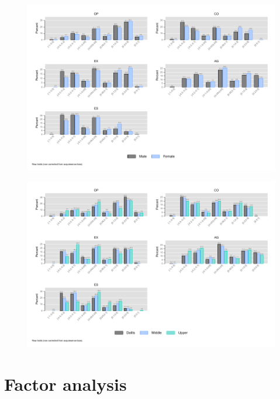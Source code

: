 \documentclass[a4paper, 12pt, onecolumn]{article}
\begin{document}
\begin{figure}[!h]
\raggedright
\includegraphics[scale=0.8]{INPUT/diff_gender_raw}
\caption{}
\label{fig:diffgendercor}
\end{figure}

\begin{figure}[!h]
\raggedright
\includegraphics[scale=0.8]{INPUT/diff_caste_raw}
\caption{}
\label{fig:diffcastecor}
\end{figure}




\clearpage
\newpage
\section{Factor analysis}
\end{document}
